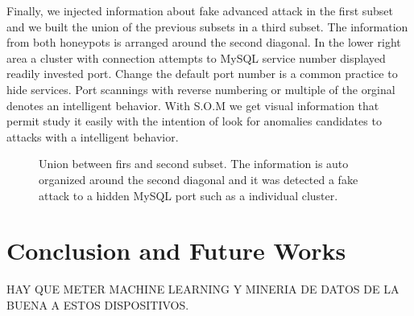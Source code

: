 \documentclass[a4paper]{llncs}
\begin{document}
Finally, we injected information about fake advanced attack in the first subset and we built the union of the previous subsets in a third subset. The information from both honeypots is arranged around the second diagonal. In the lower right area a cluster with connection attempts to MySQL service number displayed readily invested port. Change the default port number is a common practice to hide services. Port scannings with reverse numbering or multiple of the orginal denotes an intelligent behavior. With S.O.M we get visual information that permit study it easily with the intention of look for  anomalies candidates to attacks with a intelligent behavior.

\begin{figure}[h]
	\label{fig:internalTypes}
	\caption{Union between firs and second subset. The information is auto organized around the second diagonal and it was detected a fake attack to a hidden MySQL port such as a individual cluster.}
\end{figure}

\section{Conclusion and Future Works}
\label{sec:conclusion&future}
HAY QUE METER MACHINE LEARNING Y MINERIA DE DATOS DE LA BUENA A ESTOS DISPOSITIVOS.



\end{document}
